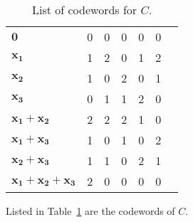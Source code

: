 \begin{table}[!htp]\centering
\begin{tabular}{l|rrrrrr}\toprule
$\bm{0}$ &0 &0 &0 &0 &0 \\
$\bm{x_1}$ &1 &2 &0 &1 &2 \\
$\bm{x_2}$ &1 &0 &2 &0 &1 \\
$\bm{x_3}$ &0 &1 &1 &2 &0 \\
$\bm{x_1+x_2}$ &2 &2 &2 &1 &0 \\
$\bm{x_1+x_3}$ &1 &0 &1 &0 &2 \\
$\bm{x_2+x_3}$ &1 &1 &0 &2 &1 \\
$\bm{x_1+x_2+x_3}$ &2 &0 &0 &0 &0 \\
\bottomrule
\end{tabular}
\caption{List of codewords for $C$.}\label{tab:7}
\end{table}%
Listed in Table~\ref{tab:7} are the codewords of $C$.
